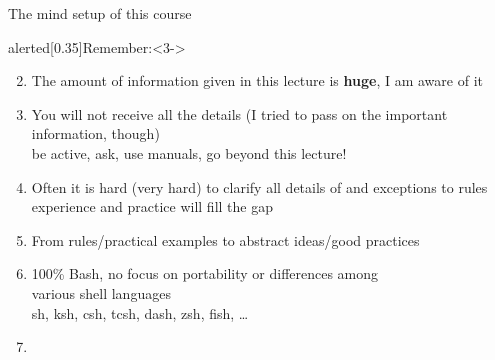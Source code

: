 \begin{frame}{The mind setup of this course}
    \vspace{-3mm}
    \begin{varblock}{alerted}[0.35\textwidth]{Remember:}<3->
    \end{varblock}
    \vspace{1mm}
    \begin{enumerate}
        \setcounter{enumi}{1}
        \item<3-> The amount of information given in this lecture is \textbf{huge}, I am aware of it
        \item<3-> You will not receive all the details (I tried to pass on the important information, though)\\
                  \then be active, ask, use manuals, go beyond this lecture!
        \item<4-> Often it is hard (very hard) to clarify all details of and exceptions to rules \\
                  \then experience and practice will fill the gap
        \item<4-> From rules/practical examples to abstract ideas/good practices
        \item<5-> 100\% Bash, no focus on portability or differences among \\ various shell languages \\
                  \then sh, ksh, csh, tcsh, dash, zsh, fish, \ldots
        \setcounter{enumi}{0}
        \item<2-> \\
    \end{enumerate}
\end{frame}
